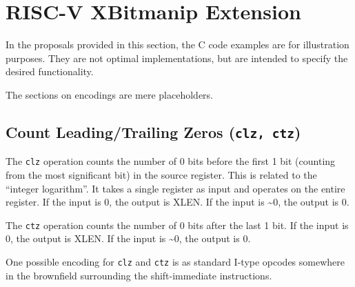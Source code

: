\chapter{RISC-V XBitmanip Extension}

In the proposals provided in this section, the C code examples are for
illustration purposes. They are not optimal implementations, but are
intended to specify the desired functionality.

The sections on encodings are mere placeholders.


\section{Count Leading/Trailing Zeros (\texttt{clz, ctz})}

The {\tt clz} operation counts the number of 0 bits before the first 1 bit
(counting from the most significant bit) in the source register. This is
related to the ``integer logarithm''. It takes a single register as
input and operates on the entire register. If the input is 0, the output is
XLEN. If the input is \textasciitilde{}0, the output is 0.

The {\tt ctz} operation counts the number of 0 bits after the last 1 bit.
If the input is 0, the output is XLEN. If the input is \textasciitilde{}0,
the output is 0.





One possible encoding for \texttt{clz} and \texttt{ctz} is as standard I-type opcodes
somewhere in the brownfield surrounding the shift-immediate instructions.

